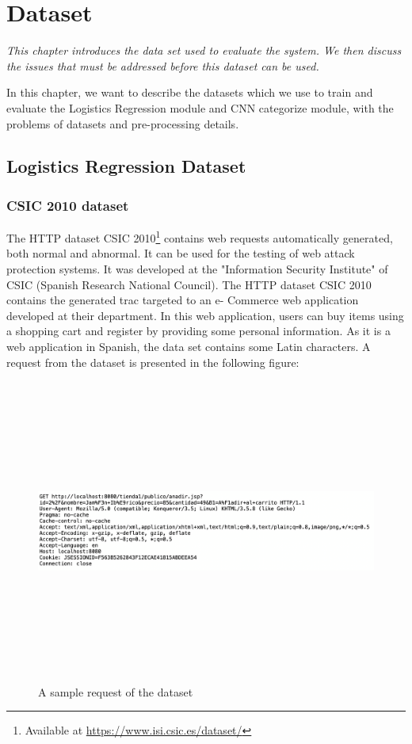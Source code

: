 \chapter{Dataset}
\label{chap:dataset}
	\textit{This chapter introduces the data set used to evaluate the system. We then discuss the issues that must be addressed before this dataset can be used.}
\minitoc

In this chapter, we want to describe the datasets which we use to train and evaluate the Logistics Regression module and CNN categorize module, with the problems of datasets and pre-processing details. 
\section{Logistics Regression Dataset}
\label{sec:logistic_dataset}
\subsection{CSIC 2010 dataset}
The HTTP dataset CSIC 2010\footnote{Available at \url{https://www.isi.csic.es/dataset/}} contains web requests automatically generated, both normal and abnormal. It can be used for the testing of web attack protection systems. It was developed at the "Information Security Institute" of CSIC (Spanish Research National Council). The HTTP dataset CSIC 2010 contains the generated trac targeted to an e- Commerce web application developed at their department. In this web application, users can buy items using a shopping cart and register by providing some personal information. As it is a web application in Spanish, the data set contains some Latin characters. A request from the dataset is presented in the following figure:

\begin{figure}[!h]
	\centering
	\includegraphics[width=\linewidth, height=10cm,keepaspectratio]{figures/dataset1.png}
  \caption{A sample request of the dataset}
\end{figure} 

